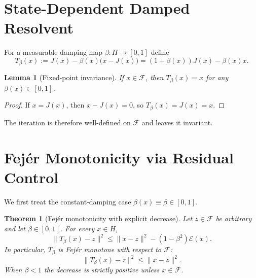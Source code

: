 \documentclass{article}
\newtheorem{theorem}{Theorem}
\newtheorem{lemma}{Lemma}
\begin{document}
\section{State-Dependent Damped Resolvent}

For a measurable damping map \(\beta: H \to [0,1]\) define
\[
T_{\beta}(x) := J(x) - \beta(x) \bigl( x - J(x) \bigr) = (1 + \beta(x)) J(x) - \beta(x) x.
\]

\begin{lemma}[Fixed-point invariance]
If \(x \in \mathcal{F}\), then \(T_{\beta}(x) = x\) for any \(\beta(x) \in [0,1]\).
\end{lemma}
\begin{proof}
If \(x = J(x)\), then \(x - J(x) = 0\), so \(T_{\beta}(x) = J(x) = x\).
\end{proof}

The iteration is therefore well-defined on \(\mathcal{F}\) and leaves it invariant.

\section{Fejér Monotonicity via Residual Control}

We first treat the constant-damping case \(\beta(x) \equiv \beta \in [0,1]\).

\begin{theorem}[Fejér monotonicity with explicit decrease]
Let \(z \in \mathcal{F}\) be arbitrary and let \(\beta \in [0,1]\). For every \(x \in H\),
\[
\|T_{\beta}(x) - z\|^2 \le \|x - z\|^2 - (1 - \beta^2) \mathcal{E}(x).
\]
In particular, \(T_{\beta}\) is Fejér monotone with respect to \(\mathcal{F}\):
\[
\|T_{\beta}(x) - z\|^2 \le \|x - z\|^2.
\]
When \(\beta < 1\) the decrease is strictly positive unless \(x \in \mathcal{F}\).
\end{theorem}
\end{document}
